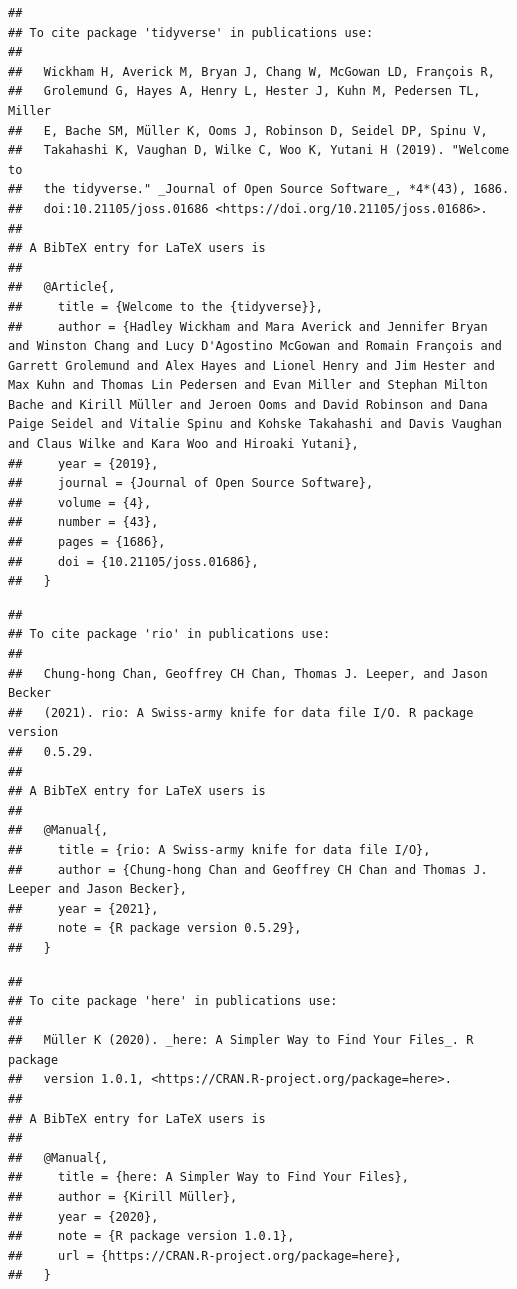 \documentclass[
  man,floatsintext]{apa6}
\begin{document}
\begin{verbatim}
## 
## To cite package 'tidyverse' in publications use:
## 
##   Wickham H, Averick M, Bryan J, Chang W, McGowan LD, François R,
##   Grolemund G, Hayes A, Henry L, Hester J, Kuhn M, Pedersen TL, Miller
##   E, Bache SM, Müller K, Ooms J, Robinson D, Seidel DP, Spinu V,
##   Takahashi K, Vaughan D, Wilke C, Woo K, Yutani H (2019). "Welcome to
##   the tidyverse." _Journal of Open Source Software_, *4*(43), 1686.
##   doi:10.21105/joss.01686 <https://doi.org/10.21105/joss.01686>.
## 
## A BibTeX entry for LaTeX users is
## 
##   @Article{,
##     title = {Welcome to the {tidyverse}},
##     author = {Hadley Wickham and Mara Averick and Jennifer Bryan and Winston Chang and Lucy D'Agostino McGowan and Romain François and Garrett Grolemund and Alex Hayes and Lionel Henry and Jim Hester and Max Kuhn and Thomas Lin Pedersen and Evan Miller and Stephan Milton Bache and Kirill Müller and Jeroen Ooms and David Robinson and Dana Paige Seidel and Vitalie Spinu and Kohske Takahashi and Davis Vaughan and Claus Wilke and Kara Woo and Hiroaki Yutani},
##     year = {2019},
##     journal = {Journal of Open Source Software},
##     volume = {4},
##     number = {43},
##     pages = {1686},
##     doi = {10.21105/joss.01686},
##   }
\end{verbatim}

\begin{verbatim}
## 
## To cite package 'rio' in publications use:
## 
##   Chung-hong Chan, Geoffrey CH Chan, Thomas J. Leeper, and Jason Becker
##   (2021). rio: A Swiss-army knife for data file I/O. R package version
##   0.5.29.
## 
## A BibTeX entry for LaTeX users is
## 
##   @Manual{,
##     title = {rio: A Swiss-army knife for data file I/O},
##     author = {Chung-hong Chan and Geoffrey CH Chan and Thomas J. Leeper and Jason Becker},
##     year = {2021},
##     note = {R package version 0.5.29},
##   }
\end{verbatim}

\begin{verbatim}
## 
## To cite package 'here' in publications use:
## 
##   Müller K (2020). _here: A Simpler Way to Find Your Files_. R package
##   version 1.0.1, <https://CRAN.R-project.org/package=here>.
## 
## A BibTeX entry for LaTeX users is
## 
##   @Manual{,
##     title = {here: A Simpler Way to Find Your Files},
##     author = {Kirill Müller},
##     year = {2020},
##     note = {R package version 1.0.1},
##     url = {https://CRAN.R-project.org/package=here},
##   }
\end{verbatim}
\end{document}
